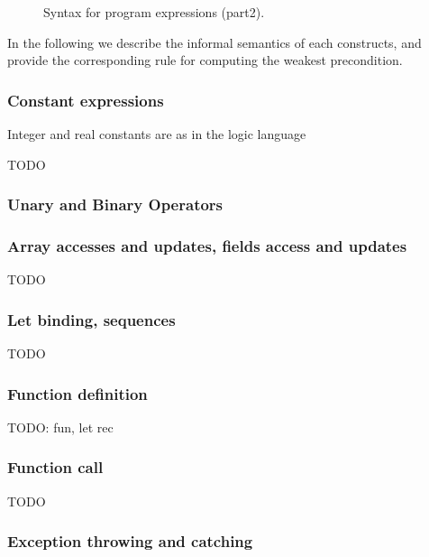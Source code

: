 \begin{figure}
  \begin{center}\framebox{}\end{center}
  \caption{Syntax for program expressions (part2).}
\label{fig:bnf:exprb}
\end{figure}

In the following we describe the informal semantics of each constructs, and provide the corresponding rule for computing the weakest precondition.


\subsubsection{Constant expressions}

Integer and real constants are as in the logic language

TODO

\subsubsection{Unary and Binary Operators}

\subsubsection{Array accesses and updates, fields access and updates}

TODO

\subsubsection{Let binding, sequences}

TODO

\subsubsection{Function definition}

TODO: fun, let rec

\subsubsection{Function call}

TODO

\subsubsection{Exception throwing and catching}

